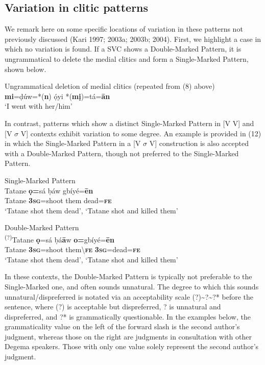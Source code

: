 \documentclass[output=paper]{langsci/langscibook}
\begin{document}
\subsection{Variation in clitic patterns}
\label{bkm:Ref449531511}
We remark here on some specific locations of variation in these patterns not previously discussed (Kari 1997; 2003a; 2003b; 2004). First, we highlight a case in which no variation is found. If a SVC shows a Double-Marked Pattern, it is ungrammatical to delete the medial clitics and form a Single-Marked Pattern, shown below.

\ea
{Ungrammatical deletion of medial clitics (repeated from (8) above)}\\
\textbf{mi}=ḍúw=*(\textbf{n})   ọ́yi   *(\textbf{mị})=tá=\textbf{\={a}n}\\
\glt ‘I went with her/him’ \citep[201]{Kari2004}
\z

In contrast, patterns which show a distinct Single-Marked Pattern in [V V] and [V $\sigma $ V] contexts exhibit variation to some degree. An example is provided in (12) in which the Single-Marked Pattern in a [V $\sigma $ V] construction is also accepted with a Double-Marked Pattern, though not preferred to the Single-Marked Pattern.

\ea
Single-Marked Pattern\\
\gll    Tatane  \textbf{ọ=}sá    ḅáw   gbíyé=\textbf{\={e}n}\\
     Tatane  \textbf{3}\textbf{\textsc{sg}}=shoot  them   dead=\textbf{\textsc{fe}}\\
\glt ‘Tatane shot them dead’, ‘Tatane shot and killed them’ 

\ex
 Double-Marked Pattern\\
\ea
\gll  \textsuperscript{(?)}Tatane  \textbf{ọ}=sá    ḅá\textbf{\={a}}w    \textbf{o=}gbíyé=\textbf{\={e}n}\\
     Tatane  \textbf{3}\textbf{\textsc{sg}}=shoot   them{\textbackslash}\textbf{\textsc{fe    }}\textbf{3}\textbf{\textsc{sg}}=dead=\textbf{\textsc{fe}}\\
\glt ‘Tatane shot them dead’, ‘Tatane shot and killed them’
\z
\z

In these contexts, the Double-Marked Pattern is typically not preferable to the Single-Marked one, and often sounds unnatural. The degree to which this sounds unnatural/dispreferred is notated via an acceptability scale (?){\textasciitilde}?{\textasciitilde}?* before the sentence, where (?) is acceptable but dispreferred, ? is unnatural and dispreferred, and ?* is grammatically questionable. In the examples below, the grammaticality value on the left of the forward slash is the second author’s judgment, whereas those on the right are judgments in consultation with other Degema speakers. Those with only one value solely represent the second author’s judgment.
\end{document}
